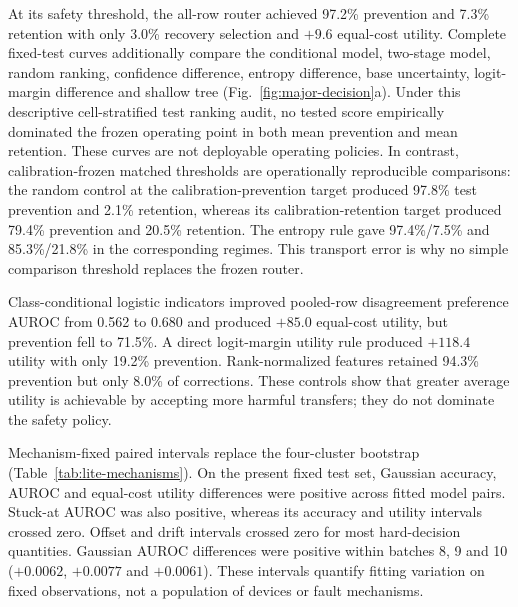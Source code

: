 \documentclass[11pt]{article}
\begin{document}
At its safety threshold, the all-row router achieved 97.2\% prevention and 7.3\% retention with only 3.0\% recovery selection and $+9.6$ equal-cost utility. Complete fixed-test curves additionally compare the conditional model, two-stage model, random ranking, confidence difference, entropy difference, base uncertainty, logit-margin difference and shallow tree (Fig.~\ref{fig:major-decision}a). Under this descriptive cell-stratified test ranking audit, no tested score empirically dominated the frozen operating point in both mean prevention and mean retention. These curves are not deployable operating policies. In contrast, calibration-frozen matched thresholds are operationally reproducible comparisons: the random control at the calibration-prevention target produced 97.8\% test prevention and 2.1\% retention, whereas its calibration-retention target produced 79.4\% prevention and 20.5\% retention. The entropy rule gave 97.4\%/7.5\% and 85.3\%/21.8\% in the corresponding regimes. This transport error is why no simple comparison threshold replaces the frozen router.

Class-conditional logistic indicators improved pooled-row disagreement preference AUROC from 0.562 to 0.680 and produced $+85.0$ equal-cost utility, but prevention fell to 71.5\%. A direct logit-margin utility rule produced $+118.4$ utility with only 19.2\% prevention. Rank-normalized features retained 94.3\% prevention but only 8.0\% of corrections. These controls show that greater average utility is achievable by accepting more harmful transfers; they do not dominate the safety policy.

Mechanism-fixed paired intervals replace the four-cluster bootstrap (Table~\ref{tab:lite-mechanisms}). On the present fixed test set, Gaussian accuracy, AUROC and equal-cost utility differences were positive across fitted model pairs. Stuck-at AUROC was also positive, whereas its accuracy and utility intervals crossed zero. Offset and drift intervals crossed zero for most hard-decision quantities. Gaussian AUROC differences were positive within batches 8, 9 and 10 ($+0.0062$, $+0.0077$ and $+0.0061$). These intervals quantify fitting variation on fixed observations, not a population of devices or fault mechanisms.

\begin{table}[ht]
\centering
\caption{\textbf{Mechanism-fixed paired differences for the hard-decision objective.} Values are Lite-CF minus PDRF. Brackets are paired 95\% Student-$t$ intervals across 10 fitted model pairs while holding mechanism and test observations fixed. Equal-cost utility uses $V_C=C_H=1$ and $\lambda=0$. These are conditional fitting-stability summaries, not population intervals.}
\label{tab:lite-mechanisms}
\resizebox{\textwidth}{!}{}
\end{table}
\end{document}
